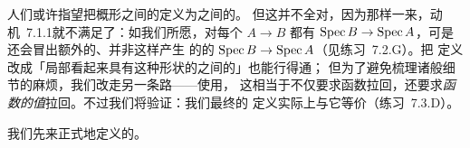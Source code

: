 人们或许指望把概形之间的\trMorphism{}定义为\trRingedSpace{}之间的\trMorphism。
但这并不全对，因为那样一来，动机~7.1.1就不满足了：如我们所愿，对每个\trMorphism{}
$A\to B$ 都有\trMorphism{} $\operatorname{Spec} B\to\operatorname{Spec} A$，可是还会冒出额外的、并非这样产生
的\trRingedSpace{}的\trMorphism{} $\operatorname{Spec} B\to\operatorname{Spec} A$（见\mbox{练习~7.2.G}）。把
定义改成「局部看起来具有这种形状的\trRingedSpace{}之间的\trMorphism」也能行得通；
但为了避免梳理诸般细节的麻烦，我们改走另一条路——使用\trLocallyRingedSpace{}，
这相当于不仅要求函数拉回，还要求\emph{函数的值}拉回。不过我们将验证：我们最终的%
定义实际上与它等价（\mbox{练习~7.3.D}）。

我们先来正式地定义\trRingedSpace{}的\trMorphism。
